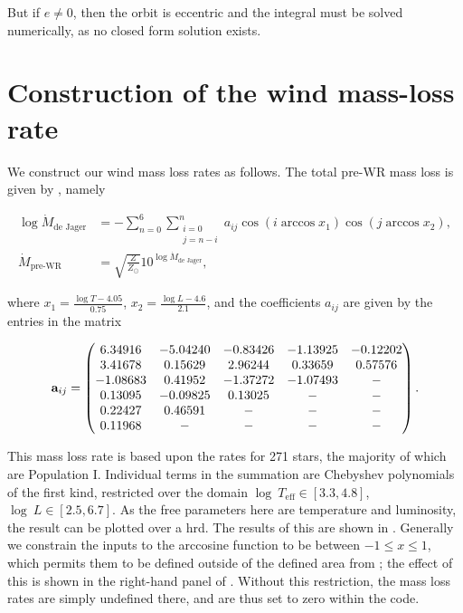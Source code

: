 But if $e\neq 0$, then the orbit is eccentric and the integral must be solved numerically, as no closed form solution exists.

\section{Construction of the wind mass-loss rate}\label{chap:mass_loss_construction}

We construct our wind mass loss rates as follows. The total pre-WR mass loss is given by \citet{De_jager:1988}, namely

\begin{align}
    \log\dot{M}_\text{de Jager} &= -\sum_{n=0}^6 \sum_{\substack{i=0\\j=n-i}}^n a_{ij}\cos\left(i\arccos x_1\right)\cos\left(j\arccos x_2\right),\label{eq:chebyshev}\\
    \dot{M}_\text{pre-WR} &= \sqrt{\frac{Z}{Z_\odot}}10^{\log\dot{M}_\text{de Jager}},\label{eq:pre-wr-ml}
\end{align}

where $x_1 = \frac{\log T-4.05}{0.75}$, $x_2=\frac{\log L-4.6}{2.1}$, and the coefficients $a_{ij}$ are given by the entries in the matrix

\begin{equation}
    \mathbf{a}_{ij} = \begin{pmatrix}
      6.34916 &  -5.04240 &  -0.83426 &  -1.13925 & -0.12202 \\
      3.41678 &   0.15629 &   2.96244 &   0.33659 &  0.57576 \\
     -1.08683 &   0.41952 &  -1.37272 &  -1.07493 &        - \\
      0.13095 &  -0.09825 &   0.13025 &         - &        - \\
      0.22427 &   0.46591 &         - &         - &        - \\
      0.11968 &         - &         - &         - &        - \\
    \end{pmatrix}.
\end{equation}

This mass loss rate is based upon the rates for 271 stars, the majority of which are Population I. Individual terms in the summation are Chebyshev polynomials of the first kind, restricted over the domain $\log~T_\text{eff}\in\left[3.3, 4.8\right]$, $\log~L\in\left[2.5, 6.7\right]$. As the free parameters here are temperature and luminosity, the result can be plotted over a \gls{hrd}. The results of this are shown in . Generally we constrain the inputs to the arccosine function to be between $-1 \leq x \leq 1$, which permits them to be defined outside of the defined area from \citet{De_jager:1988}; the effect of this is shown in the right-hand panel of . Without this restriction, the mass loss rates are simply undefined there, and are thus set to zero within the code.

